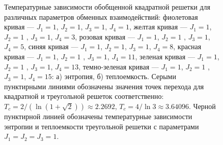\documentclass[utf8,12pt]{jetp}
\begin{document}
\begin{figure}[h]
	\begin{minipage}[h]{0.5\linewidth}
	\end{minipage}
	\hfill
	\begin{minipage}[h]{0.5\linewidth}
	\end{minipage}
	\caption{Температурные зависимости обобщенной квадратной решетки для различных параметров обменных взаимодействий: фиолетовая кривая --- $J_1 = 1$, $J_2 = 1$, $J_3 = 1$, $J_4 = 1$, желтая кривая --- $J_1 = 1$, $J_2 = 1$ , $J_3 = 1$, $J_4 = 3$, розовая кривая --- $J_1 = 1$, $J_2 = 1$ , $J_3 = 1$, $J_4 = 5$, синяя кривая --- $J_1 = 1$, $J_2 = 1$, $J_3 = 1$, $J_4 = 8$, красная кривая --- $J_1 = 1$, $J_2 = 1$ , $J_3 = 1$, $J_4 = 11$, зеленая кривая --- $J_1 = 1$, $J_2 = 1$ , $J_3 = 1$, $J_4 = 13$, темно-зеленая кривая --- $J_1 = 1$, $J_2 = 1$ , $J_3 = 1$, $J_4 = 15$: а) энтропия, б) теплоемкость. Серыми пунктирными линиями обозначены значения точек перехода для квадратной и треугольной решеток соответственно: $T_c = 2/(\ln(1+\sqrt{2}))\approx 2.2692$,  $T_c = 4/\ln 3\approx 3.64096$. Черной пунктирной линией обозначены температурные зависимости энтропии и теплоемкости треугольной решетки с параметрами $J_1 = J_2 = J_3 = 1$.}
	\label{Triangular}
\end{figure}
\end{document}
